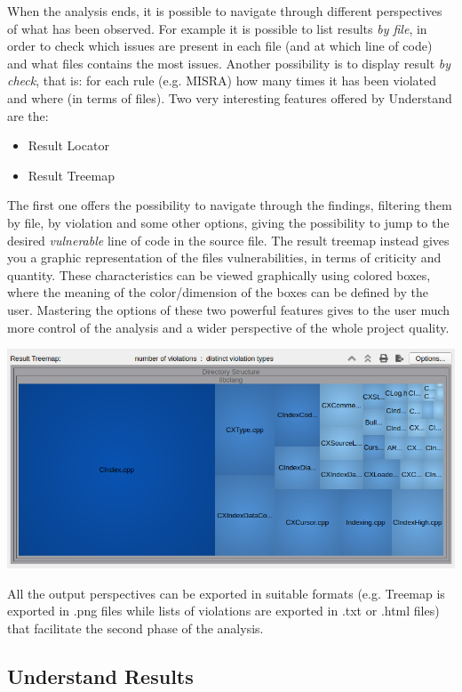 When the analysis ends, it is possible to navigate through different perspectives of what has been observed. For example it is possible to list results \textsl{by file}, in order to check which issues are present in each file (and at which line of code) and what files contains the most issues. Another possibility is to display result \textsl{by check}, that is: for each rule (e.g. MISRA) how many times it has been violated and where (in terms of files).\newline
Two very interesting features offered by Understand are the:
\begin{itemize}
	\item Result Locator
	\item Result Treemap
\end{itemize}

The first one offers the possibility to navigate through the findings, filtering them by file, by violation and some other options, giving the possibility to jump to the desired \textsl{vulnerable} line of code in the source file.\newline
The result treemap instead gives you a graphic representation of the files vulnerabilities, in terms of criticity and quantity. These characteristics can be viewed graphically using colored boxes, where the meaning of the color/dimension of the boxes can be defined by the user.\newline
Mastering the options of these two powerful features gives to the user much more control of the analysis and a wider perspective of the whole project quality.\newline\newline

\vspace{1cm}
\begin{minipage}{\linewidth}
	\includegraphics[width=\textwidth]{img/AllChecksTreeMap.png}
\end{minipage}
\vspace{1cm}

All the output perspectives can be exported in suitable formats (e.g. Treemap is exported in .png files while lists of violations are exported in .txt or .html files) that facilitate the second phase of the analysis.

\subsection{Understand Results}